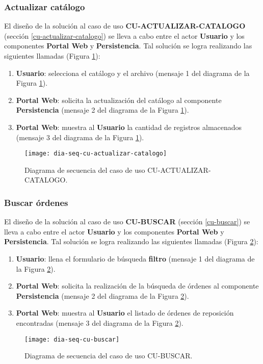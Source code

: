 \subsubsection{Actualizar catálogo}
El diseño de la solución al caso de uso \textbf{CU-ACTUALIZAR-CATALOGO} (sección \ref{cu-actualizar-catalogo}) se lleva a cabo entre el actor \textbf{Usuario} y los componentes \textbf{Portal Web} y \textbf{Persistencia}. Tal solución se logra realizando las siguientes llamadas (Figura \ref{fig:dia-seq-cu-actualizar-catalogo}):
\begin{enumerate}
	\item \textbf{Usuario}: selecciona el catálogo y el archivo (mensaje 1 del diagrama de la Figura \ref{fig:dia-seq-cu-actualizar-catalogo}).
	\item \textbf{Portal Web}: solicita la actualización del catálogo al componente \textbf{Persistencia} (mensaje 2 del diagrama de la Figura \ref{fig:dia-seq-cu-actualizar-catalogo}).
	\item \textbf{Portal Web}: muestra al \textbf{Usuario} la cantidad de registros almacenados (mensaje 3 del diagrama de la Figura \ref{fig:dia-seq-cu-actualizar-catalogo}).
\end{enumerate}
\begin{figure}[h]
	\centering
	\texttt{[image: dia-seq-cu-actualizar-catalogo]}
	\caption{Diagrama de secuencia del caso de uso CU-ACTUALIZAR-CATALOGO.}
	\label{fig:dia-seq-cu-actualizar-catalogo}
\end{figure}
\subsubsection{Buscar órdenes}
El diseño de la solución al caso de uso \textbf{CU-BUSCAR} (sección \ref{cu-buscar}) se lleva a cabo entre el actor \textbf{Usuario} y los componentes \textbf{Portal Web} y \textbf{Persistencia}. Tal solución se logra realizando las siguientes llamadas (Figura \ref{fig:dia-seq-cu-buscar}):
\begin{enumerate}
	\item \textbf{Usuario}: llena el formulario de búsqueda \textbf{filtro} (mensaje 1 del diagrama de la Figura \ref{fig:dia-seq-cu-buscar}).
	\item \textbf{Portal Web}: solicita la realización de la búsqueda de órdenes al componente \textbf{Persistencia} (mensaje 2 del diagrama de la Figura \ref{fig:dia-seq-cu-buscar}).
	\item \textbf{Portal Web}: muestra al \textbf{Usuario} el listado de órdenes de reposición encontradas (mensaje 3 del diagrama de la Figura \ref{fig:dia-seq-cu-buscar}).
\end{enumerate}
\begin{figure}[h]
	\centering
	\texttt{[image: dia-seq-cu-buscar]}
	\caption{Diagrama de secuencia del caso de uso CU-BUSCAR.}
	\label{fig:dia-seq-cu-buscar}
\end{figure}
